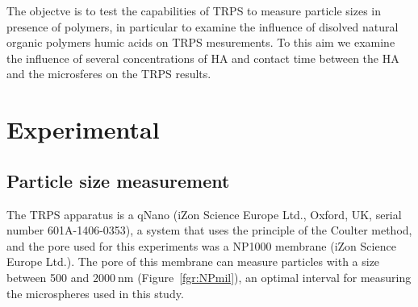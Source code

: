 \documentclass[journal=langd5,manuscript=article]{achemso}
\begin{document}
The objectve is to test the capabilities of TRPS to measure  particle sizes in presence of polymers, in particular   to examine the influence of disolved natural organic polymers humic acids  on TRPS mesurements.
To this aim we examine the influence of several concentrations of HA and contact time between the HA and the microsferes on the TRPS results.





\section{Experimental} %
\subsection{Particle size measurement}
The TRPS apparatus is a qNano (iZon Science Europe Ltd., Oxford, UK, serial number 601A-1406-0353), a system that uses the principle of the Coulter method, and the pore used for this experiments was a NP1000 membrane (iZon Science Europe Ltd.). The pore of this membrane can measure particles with a size between 500 and $2000~\mathrm{nm}$ (Figure~\ref{fgr:NPmil}), an optimal interval for measuring the microspheres used in this study.
\end{document}
